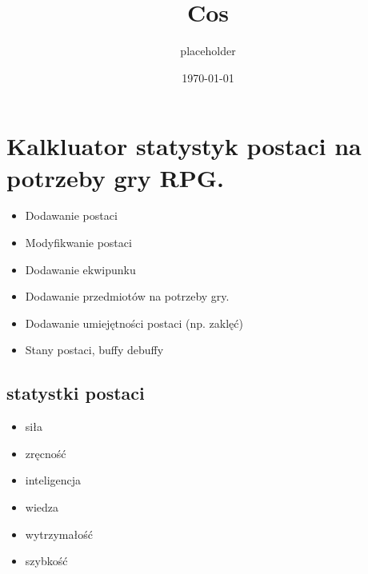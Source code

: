 \documentclass[11pt]{article}
\author{placeholder}
\date{\today}
\title{Cos}
\begin{document}
\maketitle
\tableofcontents

\section{Kalkluator statystyk postaci na potrzeby gry RPG.}
\label{sec:org6ca6fa5}
\begin{itemize}
\item Dodawanie postaci
\item Modyfikwanie postaci
\item Dodawanie ekwipunku
\item Dodawanie przedmiotów na potrzeby gry.
\item Dodawanie umiejętności postaci (np. zaklęć)
\item Stany postaci, buffy debuffy
\end{itemize}
\subsection{statystki postaci}
\label{sec:org25f3bcb}
\begin{itemize}
\item siła
\item zręcność
\item inteligencja
\item wiedza
\item wytrzymałość
\item szybkość
\end{itemize}
\end{document}
